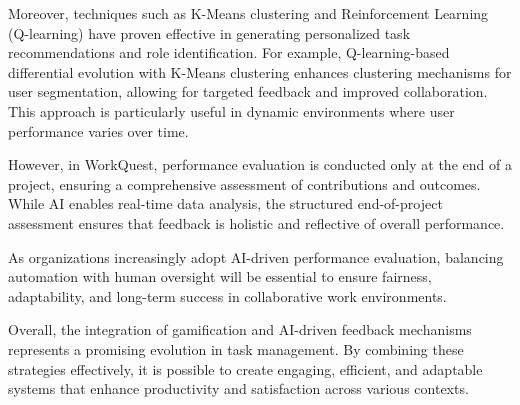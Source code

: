     Moreover, techniques such as K-Means clustering and Reinforcement Learning (Q-learning) have proven effective in generating personalized task recommendations and role identification. For example, Q-learning-based differential evolution with K-Means clustering enhances clustering mechanisms for user segmentation, allowing for targeted feedback and improved collaboration. This approach is particularly useful in dynamic environments where user performance varies over time. \cite{PlusOne:Q-learingWithK-means}

    However, in WorkQuest, performance evaluation is conducted only at the end of a project, ensuring a comprehensive assessment of contributions and outcomes. While AI enables real-time data analysis, the structured end-of-project assessment ensures that feedback is holistic and reflective of overall performance.

    As organizations increasingly adopt AI-driven performance evaluation, balancing automation with human oversight will be essential to ensure fairness, adaptability, and long-term success in collaborative work environments.

    Overall, the integration of gamification and AI-driven feedback mechanisms represents a promising evolution in task management. By combining these strategies effectively, it is possible to create engaging, efficient, and adaptable systems that enhance productivity and satisfaction across various contexts.



